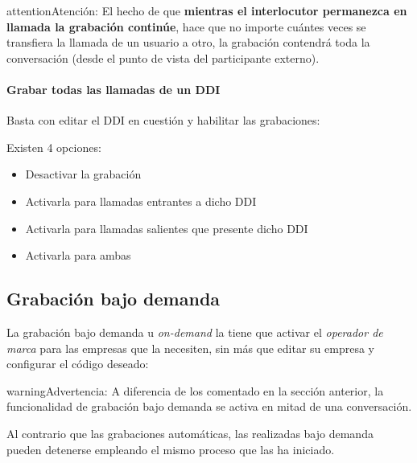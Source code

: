 \documentclass[letterpaper,10pt,spanish]{sphinxmanual}
\begin{document}
\begin{notice}{attention}{Atención:}
El hecho de que \textbf{mientras el interlocutor permanezca en llamada la grabación continúe}, hace que no importe cuántes veces se transfiera la llamada de un usuario a otro, la grabación contendrá toda la conversación (desde el punto de vista del participante externo).
\end{notice}
\paragraph{Grabar todas las llamadas de un DDI}

Basta con editar el DDI en cuestión y habilitar las grabaciones:

\noindent{}

Existen 4 opciones:
\begin{itemize}
\item {} 
Desactivar la grabación

\item {} 
Activarla para llamadas entrantes a dicho DDI

\item {} 
Activarla para llamadas salientes que presente dicho DDI

\item {} 
Activarla para ambas

\end{itemize}


\subsection{Grabación bajo demanda}
\label{pbx_features/call_recording:on-demand-recordings}
La grabación bajo demanda u \emph{on-demand} la tiene que activar el \emph{operador de marca} para las empresas que la necesiten, sin más que editar su empresa y configurar el código deseado:

\noindent{}

\begin{notice}{warning}{Advertencia:}
A diferencia de los {\hyperref[pbx_features/services:services]{}} comentado en la sección anterior, la funcionalidad de grabación bajo demanda se activa en mitad de una conversación.
\end{notice}

Al contrario que las grabaciones automáticas, las realizadas bajo demanda pueden detenerse empleando el mismo proceso que las ha iniciado.
\end{document}
